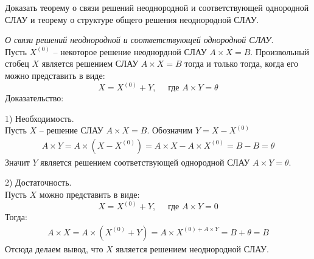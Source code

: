 \begin{question}
  Доказать теорему о связи решений неоднородной и соответствующей однородной СЛАУ и теорему о структуре общего решения неоднородной СЛАУ.
\end{question} 
\begin{answer}
  \textit{О связи решений неоднородной и соответствующей однородной СЛАУ}. \\
  Пусть $X^{(0)}$ -- некоторое решение неоднордной СЛАУ $A \times X = B$. Произвольный стобец $X$ является решением СЛАУ $A \times X = B$ тогда и только тогда, когда его можно представить в виде:  \[
    X = X^{(0)} + Y, \quad \text{ где } A \times Y = \theta
  \] 
  Доказательство:

  1) Необходимость. \\
  Пусть $X$ -- решение СЛАУ $A \times X = B$. Обозначим $Y = X - X^{(0)}$
  \begin{gather*}
    A \times Y = A \times (X - X^{(0)}) = A \times X - A \times X^{(0)} = B - B = \theta
  \end{gather*}
  Значит $Y$ является решением соответствующей однородной СЛАУ  $A \times Y = \theta$.
  
  2) Достаточность. \\
  Пусть $X$ можно представить в виде:  \[
    X = X^{(0)} + Y, \quad \text{ где } A \times Y = 0
  \]
  Тогда:
  \begin{gather*}
  A \times X = A \times (X^{(0)} + Y) = A \times X^{(0) + A \times Y} = B + \theta = B
  \end{gather*}
  Отсюда делаем вывод, что $X$ является решением неоднородной СЛАУ.
\end{answer} 

